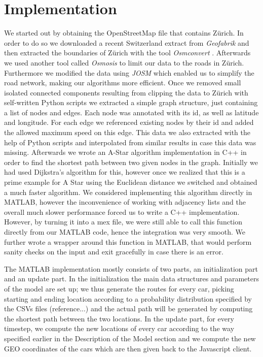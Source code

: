 \documentclass[11pt]{article}
\begin{document}
\section{Implementation}
We started out by obtaining the OpenStreetMap file that contains Z\"urich.
In order to do so we downloaded a recent Switzerland extract from \emph{Geofabrik} \cite{geofab} and then extracted the boundaries of Z\"urich with the tool \emph{Osmconvert} \cite{osmconv}.
Afterwards we used another tool called \emph{Osmosis}\cite{oosmosis} to limit our data to the roads in Z\"urich.
Furthermore we modified the data using \emph{JOSM} which enabled us to simplify the road network, making our algorithms more efficient.
Once we removed small isolated connected components resulting from clipping the data to Z\"urich with self-written Python scripts
we extracted a simple graph structure, just containing a list of nodes and edges.
Each node was annotated with its id, as well as latitude and longitude.
For each edge we referenced existing nodes by their id and added the allowed maximum speed on this edge.
This data we also extracted with the help of Python scripts and interpolated from similar results in case this data was missing.
Afterwards we wrote an A-Star algorithm implementation in C++ in order to find the shortest path between two given nodes in the graph.
Initially we had used Dijkstra's algorithm for this, however once we realized that this is a prime example for A Star using the Euclidean distance we switched and obtained a much faster algorithm.
We considered implementing this algorithm directly in MATLAB, however the inconvenience of working with adjacency lists and the overall much slower performance forced us to write a C++ implementation.
However, by turning it into a mex file, we were still able to call this function directly from our MATLAB code, hence the integration was very smooth.
We further wrote a wrapper around this function in MATLAB, that would perform sanity checks on the input and exit gracefully in case there is an error.

The MATLAB implementation mostly consists of two parts, an initialization part and an update part. In the initialization the main data structures and parameters of the model are set up; we thus generate the routes for every car, picking starting and ending location according to a probability distribution specified by the CSVs files (reference...) and the actual path will be generated by computing the shortest path between the two locations. In the update part, for every timestep, we compute the new locations of every car according to the way specified earlier in the Description of the Model section and we compute the new GEO coordinates of the cars which are then given back to the Javascript client.
\end{document}
